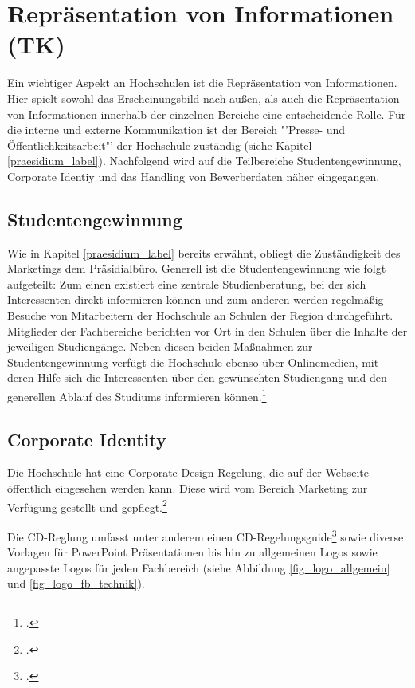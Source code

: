 \section{Repräsentation von Informationen (TK)}
Ein wichtiger Aspekt an Hochschulen ist die Repräsentation von Informationen. Hier spielt sowohl das 
Erscheinungsbild nach außen, als auch die Repräsentation von Informationen innerhalb der einzelnen Bereiche 
eine entscheidende Rolle. Für die interne und externe Kommunikation ist der Bereich "'Presse- und 
Öffentlichkeitsarbeit"' der Hochschule zuständig (siehe Kapitel \ref{praesidium_label}). Nachfolgend wird auf 
die Teilbereiche Studentengewinnung, Corporate Identiy und das Handling von Bewerberdaten näher 
eingegangen.

\subsection{Studentengewinnung}
Wie in Kapitel \ref{praesidium_label} bereits erwähnt, obliegt die Zuständigkeit des Marketings dem 
Präsidialbüro. Generell ist die Studentengewinnung wie folgt aufgeteilt: Zum einen existiert eine zentrale 
Studienberatung, bei der sich Interessenten direkt informieren können und zum anderen werden regelmäßig 
Besuche von Mitarbeitern der Hochschule an Schulen der Region durchgeführt. Mitglieder der Fachbereiche 
berichten vor Ort in den Schulen über die Inhalte der jeweiligen Studiengänge. Neben diesen beiden 
Maßnahmen zur Studentengewinnung verfügt die Hochschule ebenso über Onlinemedien, mit deren Hilfe sich 
die Interessenten über den gewünschten Studiengang und den generellen Ablauf des  Studiums informieren 
können.\footcite[Vgl.][]{gunter_muller_interview}


\subsection{Corporate Identity}
Die Hochschule hat eine Corporate Design-Regelung, die auf der Webseite öffentlich eingesehen werden 
kann. Diese wird vom Bereich Marketing zur Verfügung gestellt und 
gepflegt.\footcite[Vgl.][]{hsel_CD}

Die CD-Reglung umfasst unter anderem einen 
CD-Regelungsguide\footcite{hsel_CD-manual} sowie diverse Vorlagen für PowerPoint 
Präsentationen bis hin zu allgemeinen Logos sowie angepasste Logos für jeden Fachbereich (siehe Abbildung 
\ref{fig_logo_allgemein} und \ref{fig_logo_fb_technik}).

